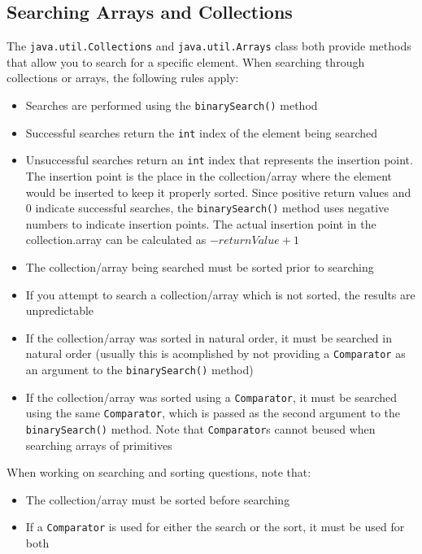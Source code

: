 \subsection{Searching Arrays and Collections}
The \verb#java.util.Collections# and \verb#java.util.Arrays# class both provide 
methods that allow you to search for a specific element. When searching through 
collections or arrays, the following rules apply:
\begin{itemize}
    \item Searches are performed using the \verb#binarySearch()# method
    \item Successful searches return the \verb#int# index of the element being 
    searched
    \item Unsuccessful searches return an \verb#int# index that represents the 
    insertion point. The insertion point is the place in the collection/array 
    where the element would be inserted to keep it properly sorted. Since 
    positive return values and 0 indicate successful searches, the 
    \verb#binarySearch()# method uses negative numbers to indicate insertion 
    points. The actual insertion point in the collection.array can be 
    calculated as $-returnValue + 1$
    \item The collection/array being searched must be sorted prior to searching
    \item If you attempt to search a collection/array which is not sorted, the 
    results are unpredictable
    \item If the collection/array was sorted in natural order, it must be 
    searched in natural order (usually this is acomplished by not providing a 
    \verb#Comparator# as an argument to the \verb#binarySearch()# method)
    \item If the collection/array was sorted using a \verb#Comparator#, it must 
    be searched using the same \verb#Comparator#, which is passed as the second 
    argument to the \verb#binarySearch()# method. Note that \verb#Comparator#s 
    cannot beused when searching arrays of primitives
\end{itemize}
When working on searching and sorting questions, note that:
\begin{itemize}
    \item The collection/array must be sorted before searching
    \item If a \verb#Comparator# is used for either the search or the sort, it 
    must be used for both
\end{itemize}

